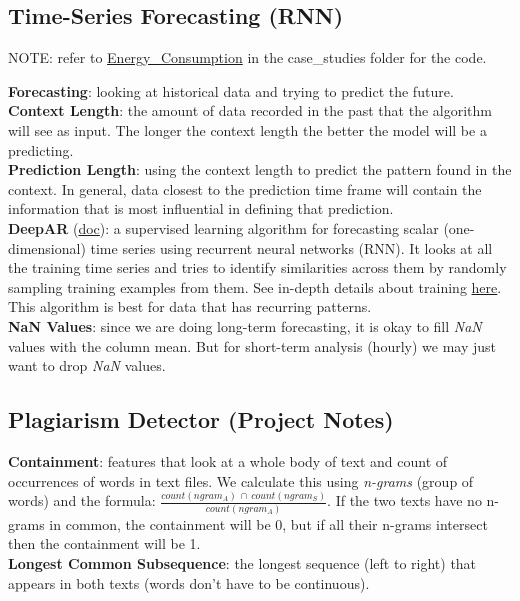 \documentclass[11pt, a4paper]{article}
\begin{document}
\begin{spacing}{1.1}
	\subsection{Time-Series Forecasting (RNN)}
	\begin{center}
	\color{darkgray} NOTE: refer to \href{file:///E:/Documents/UdacityNotes/ML\%20Engineer/sample_code/case_studies/Energy_Consumption.html}{Energy\_Consumption} in the case\_studies folder for the code. \color{black}
	\end{center}
	\textbf{Forecasting}: looking at historical data and trying to predict the future.\vspace*{2mm}\\
	\textbf{Context Length}: the amount of data recorded in the past that the algorithm will see as input. The longer the context length the better the model will be a predicting. \vspace*{2mm}\\
	\textbf{Prediction Length}: using the context length to predict the pattern found in the context. In general, data closest to the prediction time frame will contain the information that is most influential in defining that prediction. \vspace*{2mm}\\
	\textbf{DeepAR} (\href{https://docs.aws.amazon.com/sagemaker/latest/dg/deepar.html}{doc}): a supervised learning algorithm for forecasting scalar (one-dimensional) time series using recurrent neural networks (RNN). It looks at all the training time series and tries to identify similarities across them by randomly sampling training examples from them. See in-depth details about training \href{https://docs.aws.amazon.com/sagemaker/latest/dg/deepar_how-it-works.html}{here}. This algorithm is best for data that has recurring patterns. \vspace*{2mm}\\
	\textbf{NaN Values}: since we are doing long-term forecasting, it is okay to fill \textit{NaN} values with the column mean. But for short-term analysis (hourly) we may just want to drop \textit{NaN} values.\vspace*{2mm}
	
	\subsection{Plagiarism Detector (Project Notes)}
	\textbf{Containment}: features that look at a whole body of text and count of occurrences of words in text files. We calculate this using \textit{n-grams} (group of words) and the formula: $\frac{count(ngram_A)\,\cap\, count(ngram_S)}{count(ngram_A)}$. If the two texts have no n-grams in common, the containment will be 0, but if all their n-grams intersect then the containment will be 1.\vspace*{2mm}\\
	\textbf{Longest Common Subsequence}: the longest sequence (left to right) that appears in both texts (words don't have to be continuous). \newpage


\end{spacing}
\end{document}

